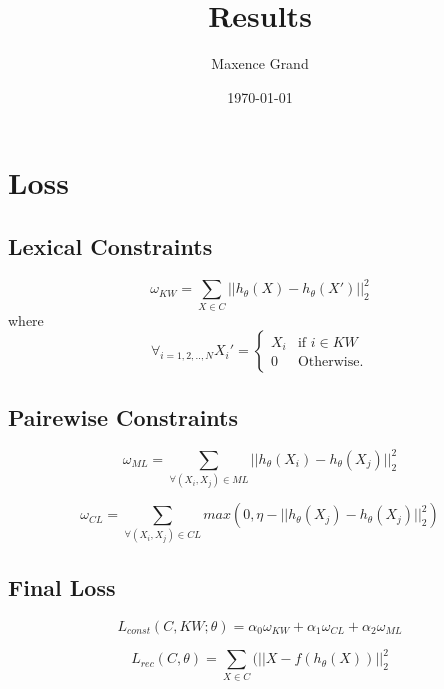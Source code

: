\documentclass[a4paper]{article}
\title{Results}
\author{Maxence Grand}
\date{\today}
\begin{document}
\maketitle

\section{Loss}

\subsection{Lexical Constraints}
\begin{equation}\label{eq:omega1}
  \omega_{KW} = \sum_{X \in C} || h_\theta(X) - h_\theta(X')||_2^2
\end{equation}
where 
\begin{equation*}
\forall_{i=1,2,..,N}X_i' = \left\{
\begin{array}{ll}
  X_i & \mbox{if } i \in KW \\
  0 & \mbox{Otherwise.}
\end{array}
\right.
\end{equation*}
\subsection{Pairewise Constraints}

\begin{equation}\label{eq:omegaML}
  \omega_{ML} = \sum_{\forall{(X_i,X_j)\in ML}} || h_\theta(X_i) - h_\theta(X_j) ||_2^2
\end{equation}

\begin{equation}\label{eq:omegaCL}
  \omega_{CL} = \sum_{\forall{(X_i,X_j)\in CL}} max(0,
  \eta - || h_\theta(X_j) - h_\theta(X_j) ||_2^2)
\end{equation}

\subsection{Final Loss}

\begin{equation}\label{eq:const}
L_{const}(C,KW;\theta) = \alpha_0\omega_{KW} + \alpha_1\omega_{CL} + \alpha_2\omega_{ML}
\end{equation}

\begin{equation}\label{eq:rec}
  L_{rec}(C, \theta) = \sum_{X \in C}(||X - f(h_\theta(X))||_2^2
\end{equation}
\end{document}
